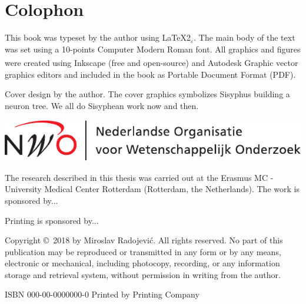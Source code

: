 %
%

\newpage
\setlength{\parindent}{0pt}
\thispagestyle{empty}

\section*{Colophon}

\bigskip
This book was typeset by the author using \LaTeX{}2{\LARGE $_{\varepsilon}$}. The main body of the text was set using a 10-points Computer Modern Roman font. All graphics and figures were created using Inkscape (free and open-source) and Autodesk \textsuperscript{\textregistered}Graphic vector graphics editors and included in the book as Portable Document Format (PDF). %

\bigskip
Cover design by the author. The cover graphics symbolizes Sisyphus building a neuron tree. We all do Sisyphean work now and then.

\vfill
\includegraphics[height=0.07\textheight]{./logos/nwo-nl}

The research described in this thesis was carried out at the Erasmus MC - University Medical Center Rotterdam (Rotterdam, the Netherlands). The work is sponsored by...
\bigskip

Printing is sponsored by...

\bigskip

Copyright \copyright\ 2018 by Miroslav Radojevi\'{c}. All rights reserved. No part of this publication may be reproduced or transmitted in any form or by any means, electronic or mechanical, including photocopy, recording, or any information storage and retrieval system, without permission in writing from the author.

\bigskip
ISBN 000-00-0000000-0
\bigskip
Printed by Printing Company
\setlength{\parindent}{\myindent}

